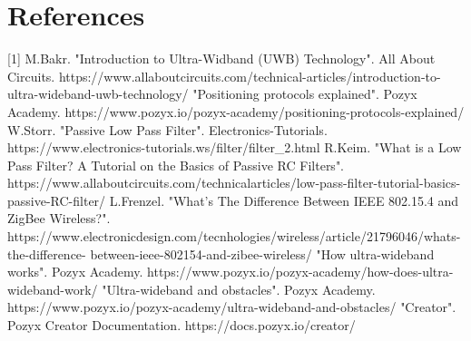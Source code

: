 \documentclass[12pt, a4paper]{article}
\begin{document}
\section{References}
[1] M.Bakr. "Introduction to Ultra-Widband (UWB) Technology". All About Circuits.
https://www.allaboutcircuits.com/technical-articles/introduction-to-ultra-wideband-uwb-technology/
\newline
\newline
[2] "Positioning protocols explained". Pozyx Academy.
https://www.pozyx.io/pozyx-academy/positioning-protocols-explained/
\newline
\newline
[3] W.Storr. "Passive Low Pass Filter". Electronics-Tutorials.
https://www.electronics-tutorials.ws/filter/filter\_2.html
\newline
\newline
[4] R.Keim. "What is a Low Pass Filter? A Tutorial on the Basics of Passive RC Filters".
https://www.allaboutcircuits.com/technicalarticles/low-pass-filter-tutorial-basics-passive-RC-filter/
\newline
\newline
[5] L.Frenzel. "What's The Difference Between IEEE 802.15.4 and ZigBee Wireless?".
https://www.electronicdesign.com/tecnhologies/wireless/article/21796046/whats-the-difference-
between-ieee-802154-and-zibee-wireless/
\newline
\newline
[6] "How ultra-wideband works". Pozyx Academy.
https://www.pozyx.io/pozyx-academy/how-does-ultra-wideband-work/
\newline
\newline
[7] "Ultra-wideband and obstacles". Pozyx Academy.
https://www.pozyx.io/pozyx-academy/ultra-wideband-and-obstacles/
\newline
\newline
[8] "Creator". Pozyx Creator Documentation.
https://docs.pozyx.io/creator/
\end{document}
